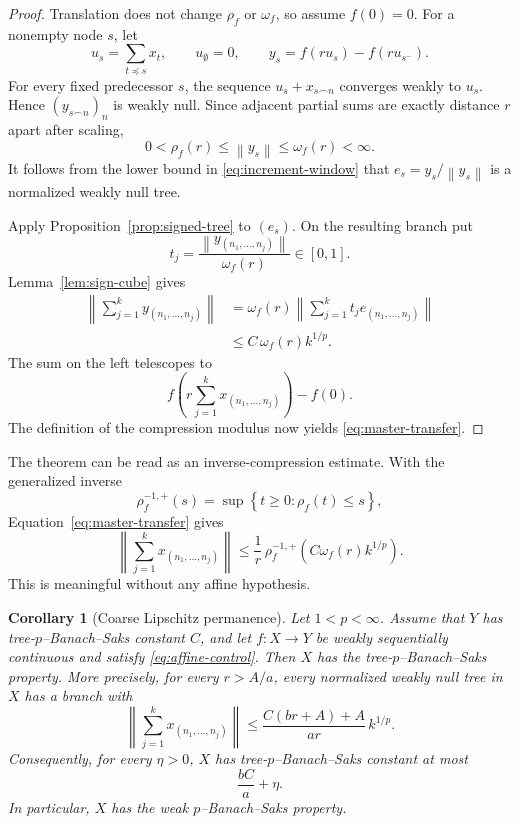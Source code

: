 \documentclass[11pt]{amsart}
\newtheorem{corollary}[theorem]{Corollary}
\theoremstyle{definition}
\theoremstyle{remark}
\newcommand{\norm}[1]{\left\lVert #1\right\rVert}
\newcommand{\set}[1]{\left\{#1\right\}}
\begin{document}
\begin{proof}
Translation does not change $\rho_f$ or $\omega_f$, so assume $f(0)=0$.  For a nonempty node $s$, let
\[
 u_s=\sum_{t\preceq s}x_t,\qquad u_\emptyset=0,
 \qquad y_s=f(ru_s)-f(ru_{s^-}).
\]
For every fixed predecessor $s$, the sequence $u_s+x_{s\frown n}$ converges weakly to $u_s$.  Hence $(y_{s\frown n})_n$ is weakly null.  Since adjacent partial sums are exactly distance $r$ apart after scaling,
\begin{equation}\label{eq:increment-window}
 0<\rho_f(r)\le\norm{y_s}\le\omega_f(r)<\infty.
\end{equation}
It follows from the lower bound in \eqref{eq:increment-window} that
$e_s=y_s/\norm{y_s}$ is a normalized weakly null tree.

Apply Proposition~\ref{prop:signed-tree} to $(e_s)$.  On the resulting branch put
\[
 t_j=\frac{\norm{y_{(n_1,\ldots,n_j)}}}{\omega_f(r)}\in[0,1].
\]
Lemma~\ref{lem:sign-cube} gives
\begin{align*}
 \norm{\sum_{j=1}^k y_{(n_1,\ldots,n_j)}}
 &=\omega_f(r)\norm{\sum_{j=1}^k t_j e_{(n_1,\ldots,n_j)}}\\
 &\le C\,\omega_f(r)k^{1/p}.
\end{align*}
The sum on the left telescopes to
\[
 f\!\left(r\sum_{j=1}^k x_{(n_1,\ldots,n_j)}\right)-f(0).
\]
The definition of the compression modulus now yields \eqref{eq:master-transfer}.
\end{proof}

The theorem can be read as an inverse-compression estimate.  With the generalized inverse
\[
 \rho_f^{-1,+}(s)=\sup\set{t\ge0:\rho_f(t)\le s},
\]
Equation~\eqref{eq:master-transfer} gives
\begin{equation}\label{eq:inverse-compression}
 \norm{\sum_{j=1}^k x_{(n_1,\ldots,n_j)}}
 \le \frac1r\,\rho_f^{-1,+}\!\left(C\omega_f(r)k^{1/p}\right).
\end{equation}
This is meaningful without any affine hypothesis.

\begin{corollary}[Coarse Lipschitz permanence]\label{cor:CL-tree-transfer}
Let $1<p<\infty$.  Assume that $Y$ has tree-$p$--Banach--Saks constant $C$, and let $f:X\to Y$ be weakly sequentially continuous and satisfy \eqref{eq:affine-control}.  Then $X$ has the tree-$p$--Banach--Saks property.  More precisely, for every $r>A/a$, every normalized weakly null tree in $X$ has a branch with
\begin{equation}\label{eq:CL-constant}
 \norm{\sum_{j=1}^k x_{(n_1,\ldots,n_j)}}
 \le \frac{C(br+A)+A}{ar}\,k^{1/p}.
\end{equation}
Consequently, for every $\eta>0$, $X$ has tree-$p$--Banach--Saks constant at most
\[
 \frac{bC}{a}+\eta.
\]
In particular, $X$ has the weak $p$--Banach--Saks property.
\end{corollary}
\end{document}
